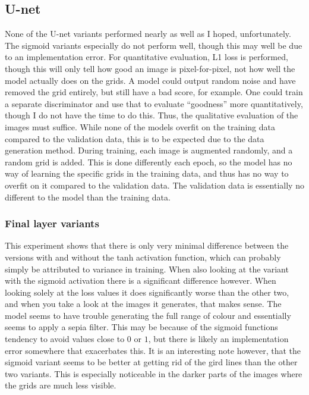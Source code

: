 \subsection{U-net}
None of the U-net variants performed nearly as well as I hoped, unfortunately. The sigmoid variants especially do not perform well, though this may well be due to an implementation error. For quantitative evaluation, L1 loss is performed, though this will only tell how good an image is pixel-for-pixel, not how well the model actually does on the grids. A model could output random noise and have removed the grid entirely, but still have a bad score, for example. One could train a separate discriminator and use that to evaluate ``goodness'' more quantitatively, though I do not have the time to do this. Thus, the qualitative evaluation of the images must suffice. While none of the models overfit on the training data compared to the validation data, this is to be expected due to the data generation method. During training, each image is augmented randomly, and a random grid is added. This is done differently each epoch, so the model has no way of learning the specific grids in the training data, and thus has no way to overfit on it compared to the validation data. The validation data is essentially no different to the model than the training data.

\subsubsection{Final layer variants}
This experiment shows that there is only very minimal difference between the versions with and without the tanh activation function, which can probably simply be attributed to variance in training. When also looking at the variant with the sigmoid activation there is a significant difference however. When looking solely at the loss values it does significantly worse than the other two, and when you take a look at the images it generates, that makes sense. The model seems to have trouble generating the full range of colour and essentially seems to apply a sepia filter. This may be because of the sigmoid functions tendency to avoid values close to $0$ or $1$, but there is likely an implementation error somewhere that exacerbates this. It is an interesting note however, that the sigmoid variant seems to be better at getting rid of the gird lines than the other two variants. This is especially noticeable in the darker parts of the images where the grids are much less visible.

